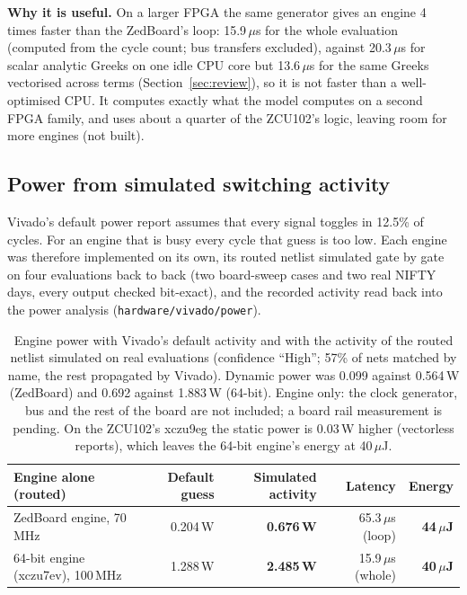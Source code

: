 \documentclass[11pt,a4paper]{article}
\newcommand{\useful}[1]{\par\noindent\textbf{\textcolor{accent}{Why it is useful.}} #1\par}
\begin{document}
\useful{On a larger FPGA the same generator gives an engine 4 times faster than the
ZedBoard's loop: 15.9\,$\mu$s for the whole evaluation (computed from the cycle count; bus
transfers excluded), against 20.3\,$\mu$s for scalar analytic Greeks on one idle CPU core but
13.6\,$\mu$s for the same Greeks vectorised across terms (Section~\ref{sec:review}), so it is
not faster than a well-optimised CPU. It computes exactly what the model computes on a second FPGA family, and
uses about a quarter of the ZCU102's logic, leaving room for more engines (not built).}

\subsection{Power from simulated switching activity}
\label{sec:power}
Vivado's default power report assumes that every signal toggles in 12.5\% of cycles. For
an engine that is busy every cycle that guess is too low. Each engine was therefore
implemented on its own, its routed netlist simulated gate by gate on four evaluations back
to back (two board-sweep cases and two real NIFTY days, every output checked bit-exact),
and the recorded activity read back into the power analysis
(\texttt{hardware/vivado/power}).

\begin{table}[H]
\centering
\small
\begin{tabular}{@{}lrrrr@{}}
\toprule
\textbf{Engine alone (routed)} & \textbf{Default guess} & \textbf{Simulated activity} & \textbf{Latency} & \textbf{Energy}\\
\midrule
ZedBoard engine, 70\,MHz & 0.204\,W & \textbf{0.676\,W} & 65.3\,$\mu$s (loop) & \textbf{44\,$\mu$J}\\
64-bit engine (xczu7ev), 100\,MHz & 1.288\,W & \textbf{2.485\,W} & 15.9\,$\mu$s (whole) & \textbf{40\,$\mu$J}\\
\bottomrule
\end{tabular}
\caption{Engine power with Vivado's default activity and with the activity of the routed
netlist simulated on real evaluations (confidence ``High''; 57\% of nets matched by name,
the rest propagated by Vivado). Dynamic power was 0.099 against 0.564\,W (ZedBoard) and
0.692 against 1.883\,W (64-bit). Engine only: the clock generator, bus and the rest of
the board are not included; a board rail measurement is pending. On the ZCU102's
xczu9eg the static power is 0.03\,W higher (vectorless reports), which leaves the 64-bit
engine's energy at 40\,$\mu$J.}
\label{tab:power}
\end{table}
\end{document}

